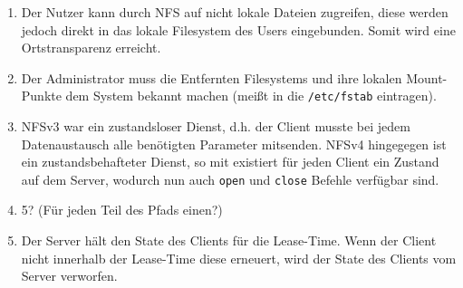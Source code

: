 \documentclass[german,12pt,a4paper]{article}
\begin{document}
\begin{enumerate}

	\item Der Nutzer kann durch NFS auf nicht lokale Dateien zugreifen, diese werden jedoch direkt in
		das lokale Filesystem des Users eingebunden. Somit wird eine Ortstransparenz erreicht.
	
	\item Der Administrator muss die Entfernten Filesystems und ihre lokalen Mount-Punkte dem System
		bekannt machen (meißt in die \texttt{/etc/fstab} eintragen).
	
	\item NFSv3 war ein zustandsloser Dienst, d.h. der Client musste bei jedem Datenaustausch alle
		benötigten Parameter mitsenden. NFSv4 hingegegen ist ein zustandsbehafteter Dienst, so mit
		existiert für jeden Client ein Zustand auf dem Server, wodurch nun auch \texttt{open} und
		\texttt{close} Befehle verfügbar sind.
	
	\item 5? (Für jeden Teil des Pfads einen?)
	
	\item Der Server hält den State des Clients für die Lease-Time. Wenn der Client nicht innerhalb
		der Lease-Time diese erneuert, wird der State des Clients vom Server verworfen.

\end{enumerate}
\end{document}
